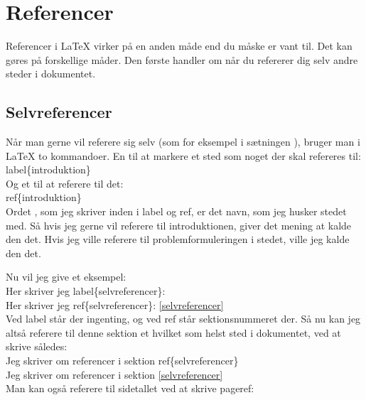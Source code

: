 \chapter{Referencer}
Referencer i LaTeX virker på en anden måde end du måske er vant til. Det kan gøres på forskellige måder. Den første handler om når du refererer dig selv andre steder i dokumentet.

\section{Selvreferencer}
Når man gerne vil referere sig selv (som for eksempel i sætningen ), bruger man i LaTeX to kommandoer. En til at markere et sted som noget der skal refereres til:\\

\bs label\{introduktion\}\\

\noindent
Og et til at referere til det:\\

\bs ref\{introduktion\}\\

\noindent
Ordet , som jeg skriver inden i \bs label og \bs ref, er det navn, som jeg husker stedet med. Så hvis jeg gerne vil referere til introduktionen, giver det mening at kalde den det. Hvis jeg ville referere til problemformuleringen i stedet, ville jeg kalde den det.

\noindent
Nu vil jeg give et eksempel:\\

\indent Her skriver jeg \bs label\{selvreferencer\}: \label{selvreferencer}\\
\indent Her skriver jeg \bs ref\{selvreferencer\}: \ref{selvreferencer}\\

\noindent
Ved \bs label står der ingenting, og ved \bs ref står sektionsnummeret der. Så nu kan jeg altså referere til denne sektion et hvilket som helst sted i dokumentet, ved at skrive således:\\

\indent Jeg skriver om referencer i sektion \bs ref\{selvreferencer\}\\
\indent Jeg skriver om referencer i sektion \ref{selvreferencer}\\

\noindent
Man kan også referere til sidetallet ved at skrive \bs pageref:\\


